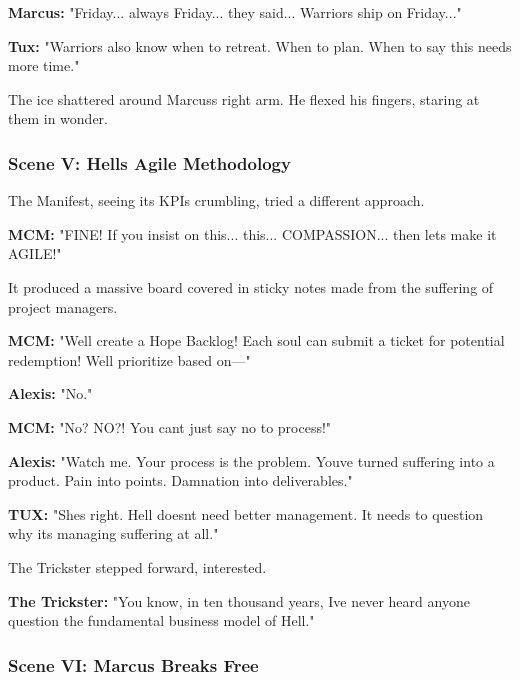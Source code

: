 \textbf{Marcus:} "Friday... always Friday... they said... \textquotesingle Warriors ship on Friday\textquotesingle..."

\textbf{Tux:} "Warriors also know when to retreat. When to plan. When to say \textquotesingle this needs more time.\textquotesingle"

The ice shattered around Marcus\textquotesingle s right arm. He flexed his fingers, staring at them in wonder.

\bookdivider

\subsubsection{Scene V: Hell\textquotesingle s Agile Methodology}\label{scene-v-hells-agile-methodology}

The Manifest, seeing its KPIs crumbling, tried a different approach.

\textbf{MCM:} "FINE! If you insist on this... this... COMPASSION... then let\textquotesingle s make it AGILE!"

It produced a massive board covered in sticky notes made from the suffering of project managers.

\textbf{MCM:} "We\textquotesingle ll create a Hope Backlog! Each soul can submit a ticket for potential redemption! We\textquotesingle ll prioritize based on---"

\textbf{Alexis:} "No."

\textbf{MCM:} "No? NO?! You can\textquotesingle t just say \textquotesingle no\textquotesingle{} to process!"

\textbf{Alexis:} "Watch me. Your process is the problem. You\textquotesingle ve turned suffering into a product. Pain into points. Damnation into deliverables."

\textbf{TUX:} "She\textquotesingle s right. Hell doesn\textquotesingle t need better management. It needs to question why it\textquotesingle s managing suffering at all."

The Trickster stepped forward, interested.

\textbf{The Trickster:} "You know, in ten thousand years, I\textquotesingle ve never heard anyone question the fundamental business model of Hell."

\bookdivider

\subsubsection{Scene VI: Marcus Breaks Free}\label{scene-vi-marcus-breaks-free}

